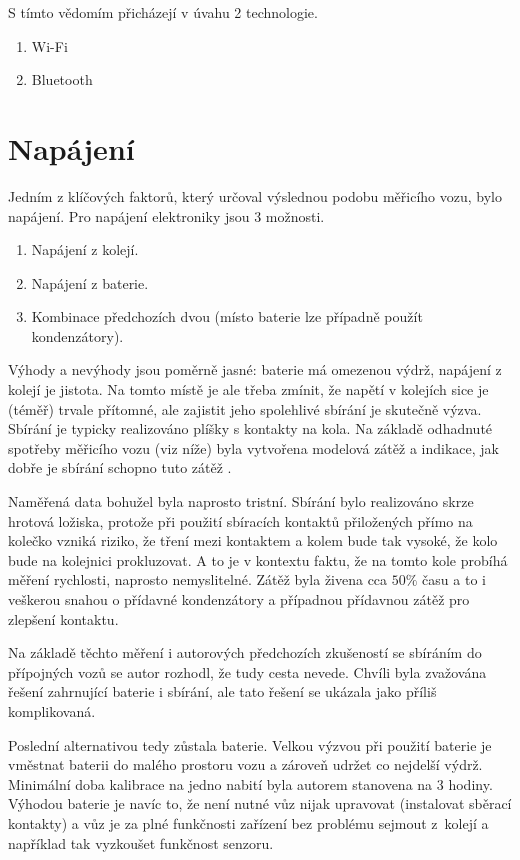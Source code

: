 S tímto vědomím přicházejí v úvahu 2 technologie.

\begin{enumerate}
\item Wi-Fi
\item Bluetooth
\end{enumerate}

\section{Napájení}

Jedním z klíčových faktorů, který určoval výslednou podobu měřicího vozu, bylo
napájení. Pro napájení elektroniky jsou 3 možnosti.

\begin{enumerate}
\item Napájení z kolejí.
\item Napájení z baterie.
\item Kombinace předchozích dvou (místo baterie lze případně použít kondenzátory).
\end{enumerate}

Výhody a nevýhody jsou poměrně jasné: baterie má omezenou výdrž, napájení
z kolejí je jistota. Na tomto místě je ale třeba zmínit, že napětí v kolejích
sice je (téměř) trvale přítomné, ale zajistit jeho spolehlivé sbírání je
skutečně výzva. Sbírání je typicky realizováno plíšky s kontakty na kola.
Na základě odhadnuté spotřeby měřicího vozu (viz níže) byla vytvořena modelová
zátěž a indikace, jak dobře je sbírání schopno tuto zátěž .

Naměřená data bohužel byla naprosto tristní. Sbírání bylo realizováno skrze
hrotová ložiska, protože při použití sbíracích kontaktů přiložených přímo na
kolečko vzniká riziko, že tření mezi kontaktem a kolem bude tak vysoké, že kolo
bude na kolejnici prokluzovat. A to je v kontextu faktu, že na tomto kole
probíhá měření rychlosti, naprosto nemyslitelné. Zátěž byla živena cca $50 \%$
času a to i veškerou snahou o přídavné kondenzátory a případnou přídavnou zátěž
pro zlepšení kontaktu.

Na základě těchto měření i autorových předchozích zkušeností se sbíráním
do přípojných vozů se autor rozhodl, že tudy cesta nevede. Chvíli byla zvažována
řešení zahrnující baterie i sbírání, ale tato řešení se ukázala jako příliš
komplikovaná.

Poslední alternativou tedy zůstala baterie. Velkou výzvou při použití baterie
je vměstnat baterii do malého prostoru vozu a zároveň udržet co nejdelší výdrž.
Minimální doba kalibrace na jedno nabití byla autorem stanovena na 3 hodiny.
Výhodou baterie je navíc to, že není nutné vůz nijak upravovat (instalovat
sběrací kontakty) a vůz je za plné funkčnosti zařízení bez problému sejmout
z~kolejí a například tak vyzkoušet funkčnost senzoru.

